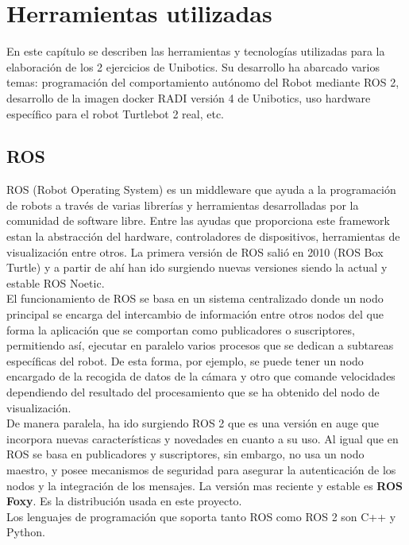 \chapter{Herramientas utilizadas}
\label{cap:capitulo3}

En este capítulo se describen las herramientas y tecnologías utilizadas para la elaboración de los 2 ejercicios de Unibotics. Su desarrollo ha abarcado varios temas: programación del comportamiento autónomo del Robot mediante ROS 2, desarrollo de la imagen docker RADI versión 4 de Unibotics, uso hardware específico para el robot Turtlebot 2 real, etc.

\section{ROS}
\label{sec:ros}
ROS (Robot Operating System) es un middleware que ayuda a la programación de robots a través de varias librerías y herramientas desarrolladas por la comunidad de software libre. Entre las ayudas que proporciona este framework estan la abstracción del hardware, controladores de dispositivos, herramientas de visualización entre otros. La primera versión de ROS salió en 2010 (ROS Box Turtle) y a partir de ahí han ido surgiendo nuevas versiones siendo la actual y estable ROS Noetic.\\

El funcionamiento de ROS se basa en un sistema centralizado donde un nodo principal se encarga del intercambio de información entre otros nodos del que forma la aplicación que se comportan como publicadores o suscriptores, permitiendo así, ejecutar en paralelo varios procesos que se dedican a subtareas específicas del robot. De esta forma, por ejemplo, se puede tener un nodo encargado de la recogida de datos de la cámara y otro que comande velocidades dependiendo del resultado del procesamiento que se ha obtenido del nodo de visualización.\\

De manera paralela, ha ido surgiendo ROS 2 que es una versión en auge que incorpora nuevas características y novedades en cuanto a su uso. Al igual que en ROS se basa en publicadores y suscriptores, sin embargo, no usa un nodo maestro, y posee mecanismos de seguridad para asegurar la autenticación de los nodos y la integración de los mensajes. La versión mas reciente y estable es \textbf{ROS Foxy}. Es la distribución usada en este proyecto.\\

Los lenguajes de programación que soporta tanto ROS como ROS 2 son C++ y Python.

